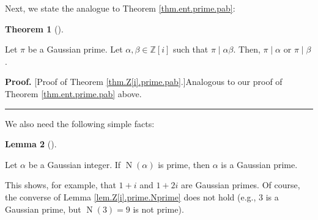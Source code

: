 \documentclass[numbers=enddot,12pt,final,onecolumn,notitlepage]{scrartcl}%
\numberwithin{exer}{subsection}
\theoremstyle{definition}
\newtheorem{theo}{Theorem}[subsection]
\newenvironment{theorem}[1][]
{\begin{theo}[#1]\begin{leftbar}}
{\end{leftbar}\end{theo}}
\newtheorem{lem}[theo]{Lemma}
\newenvironment{lemma}[1][]
{\begin{lem}[#1]\begin{leftbar}}
{\end{leftbar}\end{lem}}
\newenvironment{proof}[1][Proof]{\noindent\textbf{#1.} }{\ \rule{0.5em}{0.5em}}
\begin{document}
Next, we state the analogue to Theorem \ref{thm.ent.prime.pab}:

\begin{theorem}
\label{thm.Z[i].prime.pab}Let $\pi$ be a Gaussian prime. Let $\alpha,\beta
\in\mathbb{Z}\left[  i\right]  $ such that $\pi\mid\alpha\beta$. Then,
$\pi\mid\alpha$ or $\pi\mid\beta$.
\end{theorem}

\begin{proof}
[Proof of Theorem \ref{thm.Z[i].prime.pab}.]Analogous to our proof of Theorem
\ref{thm.ent.prime.pab} above.
\end{proof}

We also need the following simple facts:

\begin{lemma}
\label{lem.Z[i].prime.Nprime}Let $\alpha$ be a Gaussian integer. If
$\operatorname*{N}\left(  \alpha\right)  $ is prime, then $\alpha$ is a
Gaussian prime.
\end{lemma}

This shows, for example, that $1+i$ and $1+2i$ are Gaussian primes. Of course,
the converse of Lemma \ref{lem.Z[i].prime.Nprime} does not hold (e.g., $3$ is
a Gaussian prime, but $\operatorname*{N}\left(  3\right)  =9$ is not prime).
\end{document}
